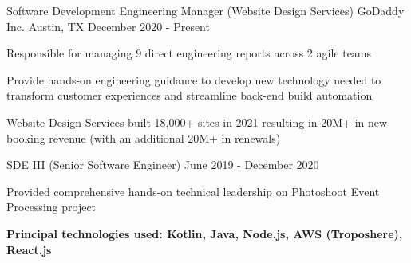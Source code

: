 

\begin{cventries}

  \cventry
    {Software Development Engineering Manager (Website Design Services)} %
    {GoDaddy Inc.} %
    {Austin, TX} %
    {December 2020 - Present} %
    {
      \begin{cvitems} %
        \item {Responsible for managing 9 direct engineering reports across 2 agile teams}
        \item {Provide hands-on engineering guidance to develop new technology needed to transform customer experiences and
streamline back-end build automation}
        \item {Website Design Services built 18,000+ sites in 2021 resulting in 20M+ in new booking revenue (with an additional
20M+ in renewals)}
      \end{cvitems}
    }

  \cventry
    {SDE III (Senior Software Engineer)} %
    {} %
    {} %
    {June 2019 - December 2020} %
    {
      \begin{cvitems} %
        \item {Provided comprehensive hands-on technical leadership on Photoshoot Event Processing project}
        \item {\textbf{Principal technologies used: Kotlin, Java, Node.js, AWS (Troposhere), React.js}}
      \end{cvitems}
    }


\end{cventries}
